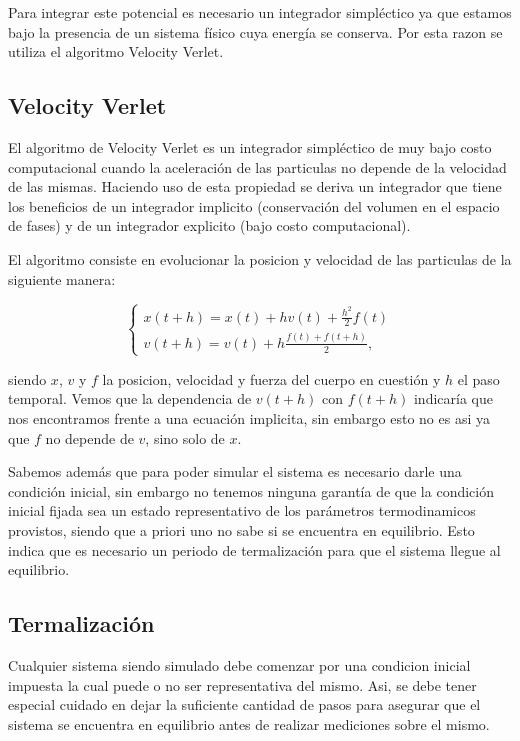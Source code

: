 \documentclass[%
 reprint,
 amsmath,amssymb,
 aps,
]{revtex4-1}
\begin{document}
Para integrar este potencial es necesario un integrador simpl\'ectico ya que
estamos bajo la presencia de un sistema f\'isico cuya energ\'ia se conserva.
Por esta razon se utiliza el algoritmo Velocity Verlet.

\subsection{Velocity Verlet}

El algoritmo de Velocity Verlet es un integrador simpl\'ectico de muy bajo
costo computacional cuando la aceleraci\'on de las particulas no depende de la
velocidad de las mismas. Haciendo uso de esta propiedad se deriva un integrador
que tiene los beneficios de un integrador implicito (conservaci\'on del volumen
en el espacio de fases) y de un integrador explicito (bajo costo computacional).

El algoritmo consiste en evolucionar la posicion y velocidad de las particulas
de la siguiente manera:

\begin{equation}
  \left \{
  \begin{matrix}
    x(t + h) = x(t) + h v(t) + \frac{h ^ 2}{2} f(t) \\
    v(t + h) = v(t) + h \frac{f(t) + f(t + h)}{2},
  \end{matrix}
  \right .
\end{equation}

siendo $x$, $v$ y $f$ la posicion, velocidad y fuerza del cuerpo en cuesti\'on
y $h$ el paso temporal. Vemos que la dependencia de $v(t + h)$ con $f(t + h)$
indicar\'ia que nos encontramos frente a una ecuaci\'on implicita, sin embargo
esto no es asi ya que $f$ no depende de $v$, sino solo de $x$.

Sabemos adem\'as que para poder simular el sistema es necesario darle una
condici\'on inicial, sin embargo no tenemos ninguna garant\'ia de que la
condici\'on inicial fijada sea un estado representativo de los par\'ametros
termodinamicos provistos, siendo que a priori uno no sabe si se encuentra en
equilibrio. Esto indica que es necesario un periodo de termalizaci\'on para que
el sistema llegue al equilibrio.

\subsection{Termalizaci\'on}

Cualquier sistema siendo simulado debe comenzar por una condicion inicial
impuesta la cual puede o no ser representativa del mismo. Asi, se debe tener
especial cuidado en dejar la suficiente cantidad de pasos para asegurar que el
sistema se encuentra en equilibrio antes de realizar mediciones sobre el mismo.
\end{document}
